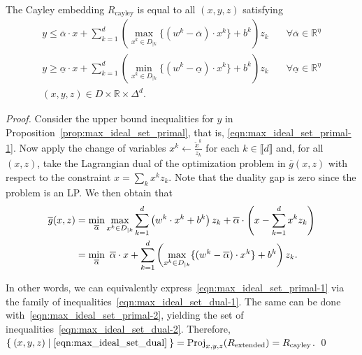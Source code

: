 \documentclass[smallextended]{svjour3}
\newcommand{\Proj}{\operatorname{Proj}}
\newcommand{\tx}{\widetilde{x}}
\newcommand{\Rcayley}{R_{\operatorname{cayley}}}
\newcommand{\Rextended}{R_{\operatorname{extended}}}
\newcommand{\ubar}[1]{\underline{#1}}
\renewcommand{\bar}[1]{\overline{#1}}
\begin{document}
\begin{proposition} \label{prop:max_ideal_set_dual}
The Cayley embedding $\Rcayley$ is equal to all $(x,y,z)$ satisfying
\begin{subequations}\label{eqn:max_ideal_set_dual}
\begin{align}
    y \leq \bar{\alpha} \cdot x + \sum_{k=1}^d \left(\max_{x^k \in D_{|k}}\{(w^k - \bar{\alpha}) \cdot x^k\} + b^k\right)z_k&\quad\forall \bar{\alpha} \in \mathbb{R}^\eta\label{eqn:max_ideal_set_dual-1}\\
    y \geq \ubar{\alpha} \cdot x + \sum_{k=1}^d \left(\min_{x^k \in D_{|k}}\{(w^k - \ubar{\alpha}) \cdot x^k\} + b^k\right)z_k&\quad\forall \ubar{\alpha} \in \mathbb{R}^\eta\label{eqn:max_ideal_set_dual-2}\\
    (x,y,z) \in D \times \mathbb{R} \times \Delta^d.
\end{align}
\end{subequations}
\end{proposition}
\begin{proof}
Consider the upper bound inequalities for $y$ in Proposition~\ref{prop:max_ideal_set_primal}, that is, \eqref{eqn:max_ideal_set_primal-1}. Now apply the change of variables $x^k \leftarrow \frac{\tx^k}{z_k}$ for each $k \in \llbracket d \rrbracket$ and, for all $(x,z)$, take the Lagrangian dual of the optimization problem in $\bar{g}(x,z)$ with respect to the constraint $x = \sum_k x^k z_k$. Note that the duality gap is zero since the problem is an LP. We then obtain that
\begin{align*}
    \bar{g}(x,z) &= \min_{\bar{\alpha}} \max_{x^k \in D_{|k}} \sum_{k=1}^d \left(w^k \cdot x^k + b^k\right) z_k + \bar{\alpha} \cdot \left(x - \sum_{k=1}^d x^k z_k\right) \notag\\
    &= \min_{\bar{\alpha}}\ \bar{\alpha} \cdot x + \sum_{k=1}^d \left(\max_{x^k \in D_{|k}}\{(w^k - \bar{\alpha}) \cdot x^k\} + b^k\right)z_k.
\end{align*}

In other words, we can equivalently express~\eqref{eqn:max_ideal_set_primal-1} via the family of inequalities~\eqref{eqn:max_ideal_set_dual-1}. The same can be done with~\eqref{eqn:max_ideal_set_primal-2}, yielding the set of inequalities~\eqref{eqn:max_ideal_set_dual-2}. Therefore, $\Set{(x,y,z) | \eqref{eqn:max_ideal_set_dual}} = \Proj_{x,y,z}(\Rextended) = \Rcayley$.
\qed\end{proof}
\end{document}
